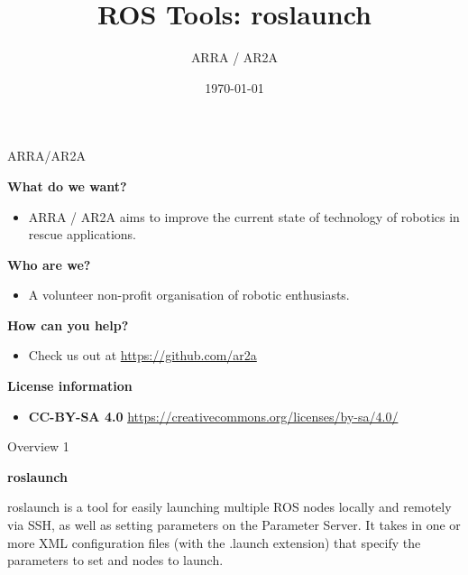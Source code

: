 \documentclass{beamer}
\title[]{ROS Tools: roslaunch} %
\author{ARRA / AR2A} %
\institute %
{
\textbf{A}dvancements for \textbf{R}obotics in \textbf{R}escue \textbf{A}pplications
}
\date{\today} %
\begin{document}
\begin{frame}
\titlepage %
\end{frame}
\begin{frame}{ARRA/AR2A}
\begin{large}\textbf{What do we want?}\end{large}
\begin{itemize}
 \item ARRA / AR2A aims to improve the current state of technology of robotics in rescue applications.
\end{itemize}
\begin{large}\textbf{Who are we?}\end{large}
\begin{itemize}
 \item A volunteer non-profit organisation of robotic enthusiasts.
\end{itemize}
\begin{large}\textbf{How can you help?}\end{large}
\begin{itemize}
 \item Check us out at \url{https://github.com/ar2a}
\end{itemize}
 \vspace{1cm}
\begin{large}\textbf{License information}\end{large}
\begin{itemize}
 \item \textbf{CC-BY-SA 4.0} \url{https://creativecommons.org/licenses/by-sa/4.0/}
\end{itemize}
\end{frame}
\begin{frame}{Overview 1}
\begin{large}
	\textbf{roslaunch} \newline \newline
\end{large}
roslaunch is a tool for easily launching multiple ROS nodes locally and remotely via SSH, as well as setting parameters on the Parameter Server. \newline \newline
It takes in one or more XML configuration files (with the .launch extension) that specify the parameters to set and nodes to launch.
\end{frame}
\end{document}
